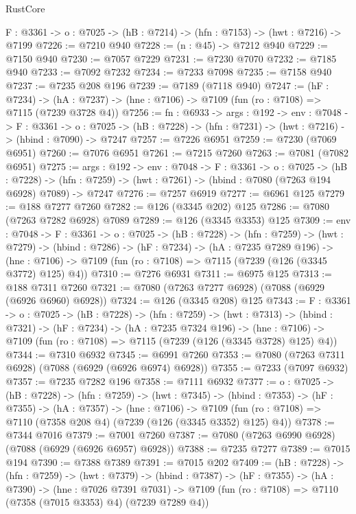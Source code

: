 \begin{lexlean}{RustCore}
\begin{coremodule}
  {F : @3361} -> {o : @7025} -> (hB : @7214) -> (hfn : @7153) -> (hwt : @7216) -> @7199
@7226 := @7210 @940
@7228 := (n : @45) -> @7212 @940
@7229 := @7150 @940
@7230 := @7057 @7229
@7231 := @7230 @7070
@7232 := @7185 @940
@7233 := @7092 @7232
@7234 := @7233 @7098
@7235 := @7158 @940
@7237 := @7235 @208 @196
@7239 := @7189 (@7118 @940)
@7247 := (hF : @7234) ->
  (hA : @7237) -> (hne : @7106) -> @7109 (fun (ro : @7108) => @7115 (@7239 @3728 @4))
@7256 := {fn : @6933} ->
  {args : @192} ->
  {env : @7048} ->
  {F : @3361} ->
  {o : @7025} -> (hB : @7228) -> (hfn : @7231) -> (hwt : @7216) -> (hbind : @7090) -> @7247
@7257 := @7226 @6951
@7259 := @7230 (@7069 @6951)
@7260 := @7076 @6951
@7261 := @7215 @7260
@7263 := @7081 (@7082 @6951)
@7275 := {args : @192} ->
  {env : @7048} ->
  {F : @3361} ->
  {o : @7025} ->
  (hB : @7228) ->
  (hfn : @7259) -> (hwt : @7261) -> (hbind : @7080 (@7263 @194 @6928) @7089) -> @7247
@7276 := @7257 @6919
@7277 := @6961 @125
@7279 := @188 @7277 @7260
@7282 := @126 (@3345 @202) @125
@7286 := @7080 (@7263 @7282 @6928) @7089
@7289 := @126 (@3345 @3353) @125
@7309 := {env : @7048} ->
  {F : @3361} ->
  {o : @7025} ->
  (hB : @7228) ->
  (hfn : @7259) ->
  (hwt : @7279) ->
  (hbind : @7286) ->
  (hF : @7234) ->
  (hA : @7235 @7289 @196) ->
  (hne : @7106) -> @7109 (fun (ro : @7108) => @7115 (@7239 (@126 (@3345 @3772) @125) @4))
@7310 := @7276 @6931
@7311 := @6975 @125
@7313 := @188 @7311 @7260
@7321 := @7080 (@7263 @7277 @6928) (@7088 (@6929 (@6926 @6960) @6928))
@7324 := @126 (@3345 @208) @125
@7343 := {F : @3361} ->
  {o : @7025} ->
  (hB : @7228) ->
  (hfn : @7259) ->
  (hwt : @7313) ->
  (hbind : @7321) ->
  (hF : @7234) ->
  (hA : @7235 @7324 @196) ->
  (hne : @7106) -> @7109 (fun (ro : @7108) => @7115 (@7239 (@126 (@3345 @3728) @125) @4))
@7344 := @7310 @6932
@7345 := @6991 @7260
@7353 := @7080 (@7263 @7311 @6928) (@7088 (@6929 (@6926 @6974) @6928))
@7355 := @7233 (@7097 @6932)
@7357 := @7235 @7282 @196
@7358 := @7111 @6932
@7377 := {o : @7025} ->
  (hB : @7228) ->
  (hfn : @7259) ->
  (hwt : @7345) ->
  (hbind : @7353) ->
  (hF : @7355) ->
  (hA : @7357) ->
  (hne : @7106) ->
  @7109 (fun (ro : @7108) => @7110 (@7358 @208 @4) (@7239 (@126 (@3345 @3352) @125) @4))
@7378 := @7344 @7016
@7379 := @7001 @7260
@7387 := @7080 (@7263 @6990 @6928) (@7088 (@6929 (@6926 @6957) @6928))
@7388 := @7235 @7277
@7389 := @7015 @194
@7390 := @7388 @7389
@7391 := @7015 @202
@7409 := (hB : @7228) ->
  (hfn : @7259) ->
  (hwt : @7379) ->
  (hbind : @7387) ->
  (hF : @7355) ->
  (hA : @7390) ->
  (hne : @7026 @7391 @7031) ->
  @7109 (fun (ro : @7108) => @7110 (@7358 (@7015 @3353) @4) (@7239 @7289 @4))

\end{coremodule}
\end{lexlean}
